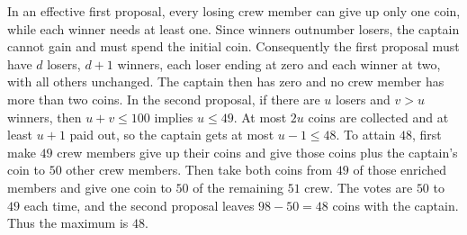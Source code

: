 In an effective first proposal, every losing crew member can give up only one coin, while each winner needs at least one. Since winners outnumber losers, the captain cannot gain and must spend the initial coin. Consequently the first proposal must have $d$ losers, $d+1$ winners, each loser ending at zero and each winner at two, with all others unchanged. The captain then has zero and no crew member has more than two coins. In the second proposal, if there are $u$ losers and $v>u$ winners, then $u+v\le100$ implies $u\le49$. At most $2u$ coins are collected and at least $u+1$ paid out, so the captain gets at most $u-1\le48$. To attain $48$, first make $49$ crew members give up their coins and give those coins plus the captain's coin to $50$ other crew members. Then take both coins from $49$ of those enriched members and give one coin to $50$ of the remaining $51$ crew. The votes are $50$ to $49$ each time, and the second proposal leaves $98-50=48$ coins with the captain. Thus the maximum is $\boxed{48}$.
